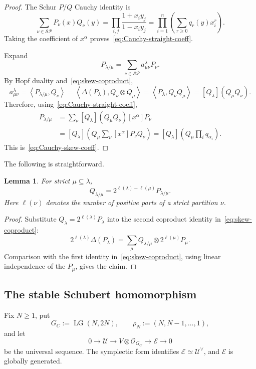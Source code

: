 \documentclass[11pt,a4paper,oneside]{amsart}
\numberwithin{equation}{section}
\newtheorem{lemma}[theorem]{Lemma}
\theoremstyle{definition}
\theoremstyle{remark}
\DeclareMathOperator{\LG}{LG}
\newcommand{\cO}{\mathcal O}
\newcommand{\cE}{\mathcal E}
\newcommand{\cU}{\mathcal U}
\newcommand{\angles}[1]{\left\langle #1\right\rangle}
\begin{document}
\begin{proof}
The Schur $P/Q$ Cauchy identity is
\begin{equation}\label{eq:PQ-Cauchy}
 \sum_{\nu\in\mathcal{SP}}P_\nu(x)Q_\nu(y)
 =\prod_{i,j}\frac{1+x_iy_j}{1-x_iy_j}
 =\prod_{i=1}^n\left(\sum_{r\geq0}q_r(y)x_i^r\right).
\end{equation}
Taking the coefficient of $x^\alpha$ proves~\eqref{eq:Cauchy-straight-coeff}.

Expand
\[
 P_{\lambda/\mu}=\sum_{\nu\in\mathcal{SP}}a_{\mu\nu}^{\lambda}P_\nu.
\]
By Hopf duality and~\eqref{eq:skew-coproduct},
\[
 a_{\mu\nu}^{\lambda}
 =\angles{P_{\lambda/\mu},Q_\nu}
 =\angles{\Delta(P_\lambda),Q_\nu\otimes Q_\mu}
 =\angles{P_\lambda,Q_\nu Q_\mu}
 =[Q_\lambda](Q_\mu Q_\nu).
\]
Therefore, using~\eqref{eq:Cauchy-straight-coeff},
\begin{align*}
 [x^\alpha]P_{\lambda/\mu}
 &=\sum_\nu [Q_\lambda](Q_\mu Q_\nu)
     [x^\alpha]P_\nu\\
 &=[Q_\lambda]\left(
 Q_\mu\sum_\nu[x^\alpha]P_\nu Q_\nu\right)
 =[Q_\lambda]\left(Q_\mu\prod_i q_{\alpha_i}\right).
\end{align*}
This is~\eqref{eq:Cauchy-skew-coeff}.
\end{proof}

The following is straightforward.

\begin{lemma}\label{lem:skew-PQ-scaling}
For strict $\mu\subseteq\lambda$,
\[
 Q_{\lambda/\mu}=2^{\ell(\lambda)-\ell(\mu)}P_{\lambda/\mu}.
\]
Here $\ell(\nu)$ denotes the number of positive parts of a strict partition $\nu$.
\end{lemma}

\begin{proof}
Substitute $Q_\lambda=2^{\ell(\lambda)}P_\lambda$ into the second coproduct identity in~\eqref{eq:skew-coproduct}:
\[
 2^{\ell(\lambda)}\Delta(P_\lambda)
 =\sum_\mu Q_{\lambda/\mu}\otimes 2^{\ell(\mu)}P_\mu.
\]
Comparison with the first identity in~\eqref{eq:skew-coproduct}, using linear independence of the $P_\mu$, gives the claim.
\end{proof}


\subsection{The stable Schubert homomorphism}

Fix $N\geq1$, put
\[
 G_C:=\LG(N,2N),
 \qquad
 \rho_N:=(N,N-1,\ldots,1),
\]
and let
\begin{equation}\label{eq:LG-universal}
 0\longrightarrow\cU\longrightarrow V\otimes\cO_{G_C}
 \longrightarrow\cE\longrightarrow0
\end{equation}
be the universal sequence.  The symplectic form identifies $\cE\simeq\cU^\vee$, and $\cE$ is globally generated.
\end{document}
